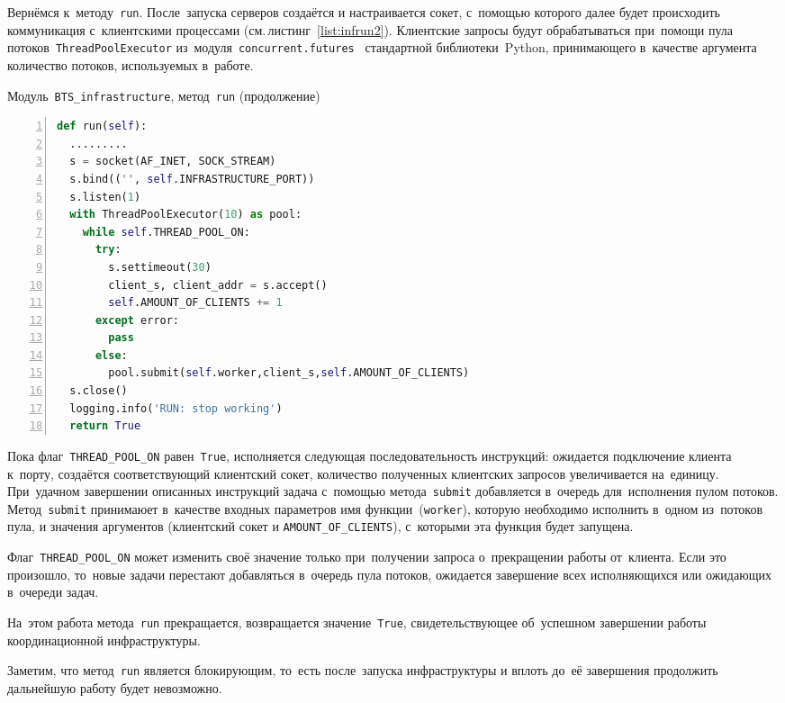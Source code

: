 Вернёмся к~методу~\texttt{run}. После~запуска серверов создаётся и настраивается сокет, с~помощью которого далее будет происходить коммуникация с~клиентскими процессами (см.\,листинг~\ref{list:infrun2}). Клиентские запросы будут обрабатываться при~помощи пула потоков~\texttt{ThreadPoolExecutor} из~модуля~\texttt{concurrent.futures}~\autocite{concurrent} стандартной библиотеки~Python, принимающего в~качестве аргумента количество потоков, используемых в~работе.
\begin{ListingEnv}\caption{Модуль~\texttt{BTS\_infrastructure}, метод~\texttt{run} (продолжение)}\label{list:infrun2}
	\begin{lstlisting}[language=Python, numbers=left]
def run(self):
  .........
  s = socket(AF_INET, SOCK_STREAM)
  s.bind(('', self.INFRASTRUCTURE_PORT))
  s.listen(1)
  with ThreadPoolExecutor(10) as pool:
    while self.THREAD_POOL_ON:
      try:
        s.settimeout(30)
        client_s, client_addr = s.accept()
        self.AMOUNT_OF_CLIENTS += 1
      except error:
        pass
      else:
        pool.submit(self.worker,client_s,self.AMOUNT_OF_CLIENTS)
  s.close()  
  logging.info('RUN: stop working')
  return True
	\end{lstlisting}
\end{ListingEnv}
Пока флаг~\texttt{THREAD_POOL_ON} равен~\texttt{True}, исполняется следующая последовательность инструкций: ожидается подключение клиента к~порту, создаётся соответствующий клиентский сокет, количество полученных клиентских запросов увеличивается на~единицу. При~удачном завершении описанных инструкций задача с~помощью метода~\texttt{submit} добавляется в~очередь для~исполнения пулом потоков. Метод~\texttt{submit} принимаюет в~качестве входных параметров имя функции~(\texttt{worker}), которую необходимо исполнить в~одном из~потоков пула, и значения аргументов (клиентский сокет и \texttt{AMOUNT_OF_CLIENTS}), с~которыми эта функция будет запущена.

Флаг~\texttt{THREAD_POOL_ON} может изменить своё значение только при~получении запроса о~прекращении работы от~клиента. Если это произошло, то~новые задачи перестают добавляться в~очередь пула потоков, ожидается завершение всех исполняющихся или ожидающих в~очереди задач.

На~этом работа метода~\texttt{run} прекращается, возвращается значение~\texttt{True}, свидетельствующее об~успешном завершении работы координационной инфраструктуры.

Заметим, что метод~\texttt{run} является блокирующим, то~есть после~запуска инфраструктуры и вплоть до~её завершения продолжить дальнейшую работу будет невозможно.

